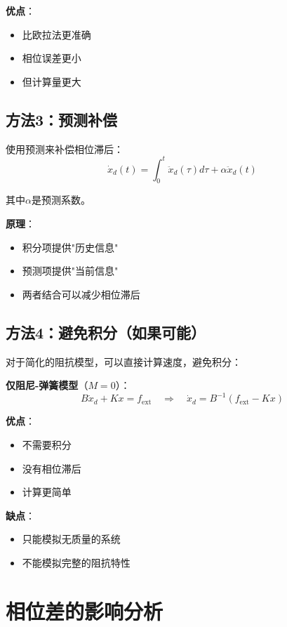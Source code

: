 \documentclass[12pt,a4paper]{article}
\begin{document}
\begin{enumerate}
\textbf{优点}：
\begin{itemize}
\item 比欧拉法更准确
\item 相位误差更小
\item 但计算量更大
\end{itemize}

\subsection{方法3：预测补偿}

使用预测来补偿相位滞后：
\begin{equation}
\dot{x}_d(t) = \int_0^t \ddot{x}_d(\tau) d\tau + \alpha \ddot{x}_d(t)
\end{equation}

其中$\alpha$是预测系数。

\textbf{原理}：
\begin{itemize}
\item 积分项提供"历史信息"
\item 预测项提供"当前信息"
\item 两者结合可以减少相位滞后
\end{itemize}

\subsection{方法4：避免积分（如果可能）}

对于简化的阻抗模型，可以直接计算速度，避免积分：

\textbf{仅阻尼-弹簧模型}（$M = 0$）：
\begin{equation}
B\dot{x}_d + Kx = f_{\text{ext}} \quad \Rightarrow \quad \dot{x}_d = B^{-1}(f_{\text{ext}} - Kx)
\end{equation}

\textbf{优点}：
\begin{itemize}
\item 不需要积分
\item 没有相位滞后
\item 计算更简单
\end{itemize}

\textbf{缺点}：
\begin{itemize}
\item 只能模拟无质量的系统
\item 不能模拟完整的阻抗特性
\end{itemize}

\section{相位差的影响分析}


\end{enumerate}
\end{document}
